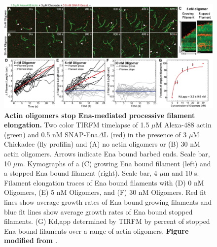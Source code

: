 \begin{figure}
\centering
\includegraphics[width=\textwidth]{img/ch04/Oligomer_Ena_Figure.jpg}
\caption[Actin oligomers stop Ena-mediated processive filament elongation.]{\textbf{Actin oligomers stop Ena-mediated processive filament elongation.} Two color TIRFM timelapse of 1.5 $\mu$M Alexa-488 actin (green) and 0.5 nM SNAP-Ena$\Delta$L (red) in the presence of 3 $\mu$M Chickadee (fly profilin) and (A) no actin oligomers or (B) 30 nM actin oligomers. Arrows indicate Ena bound barbed ends. Scale bar, 10 $\mu$m. Kymographs of a (C) growing Ena bound filament (left) and a stopped Ena bound filament (right). Scale bar, 4 $\mu$m and 10 s. Filament elongation traces of Ena bound filaments with (D) 0 nM Oligomers, (E) 5 nM Oligomers, and (F) 30 nM Oligomers. Red fit lines show average growth rates of Ena bound growing filaments and blue fit lines show average growth rates of Ena bound stopped filaments. (G) Kd,app determined by TIRFM by percent of stopped Ena bound filaments over a range of actin oligomers. \textbf{Figure modified from \citep{kudryashova_actin_2018}}.}
\label{fig:ena-oligomers}
\end{figure}

